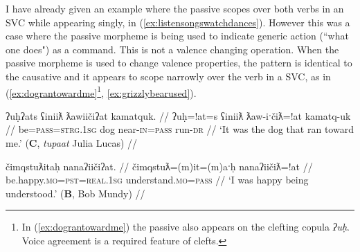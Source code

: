 \begin{comment}


\ex \label{ex:headonback}
\begingl
\glpreamble ʔuc̓aʔap̓at t̓uḥc̓iti hił ʔapw̓inʔatʔi. //
\gla ʔucaap=!at t̓uḥc̓iti hił ʔapw̓in=!at=ʔiˑ //
\glb make.go=\textsc{pass} head be.at shoulder=\textsc{poss.inalien}=\textsc{art} //
\glft `He put his head on his shoulder.' (\textbf{C}, \textit{tupaat} Julia Lucas) //
\endgl
\xe

\ex~ \label{ex:makesitdown}
\begingl
\glpreamble ʔaḥʔaaʔaƛʔał t̓iqʷaasʔap̓aƛʔał ḥaakʷaaƛʔi Monica. //
\gla ʔaḥʔaaʔaƛ=ʔał t̓iqʷ-aas=!ap=!aƛ=ʔał ḥaakʷaaƛ=ʔiˑ Monica //
\glb and.then=\textsc{pl} be.at=\textsc{caus} sit-horizontal.surface=\textsc{caus}=\textsc{now}=\textsc{pl} young.woman=\textsc{art} Monica //
\glft `And then they made the young girl Monica sit on a chair.' (\textbf{C}, \textit{tupaat} Julia Lucas) //
\endgl
\xe
\end{comment}

I have already given an example where the passive scopes over both verbs in an SVC while appearing singly, in (\ref{ex:listensongswatchdances}). However this was a case where the passive morpheme is being used to indicate generic action (``what one does") as a command. This is not a valence changing operation. When the passive morpheme is used to change valence properties, the pattern is identical to the causative and it appears to scope narrowly over the verb in a SVC, as in (\ref{ex:dograntowardme}\footnote{In (\ref{ex:dograntowardme}) the passive also appears on the clefting copula \textit{ʔuḥ}. Voice agreement is a required feature of clefts.}, \ref{ex:grizzlybearused}).

\ex \label{ex:dograntowardme}
\begingl
\glpreamble ʔuḥʔats ʕiniiƛ ƛawiičiʔat kamatquk. //
\gla ʔuḥ=!at=s ʕiniiƛ ƛaw-iˑčiƛ=!at kamatq-uk //
\glb be=\textsc{pass}=\textsc{strg.1sg} dog near-\textsc{in}=\textsc{pass} run-\textsc{dr} //
\glft `It was the dog that ran toward me.' (\textbf{C}, \textit{tupaat} Julia Lucas) //
\endgl
\xe

\ex \label{ex:happyunderstood}
\begingl
\glpreamble čimqstuƛitaḥ nanaʔiičiʔat. //
\gla čimqstuƛ=(m)it=(m)aˑḥ nanaʔiičiƛ=!at //
\glb be.happy.\textsc{mo}=\textsc{pst}=\textsc{real.1sg} understand.\textsc{mo}=\textsc{pass} //
\glft `I was happy being understood.' (\textbf{B}, Bob Mundy) //
\endgl
\xe

